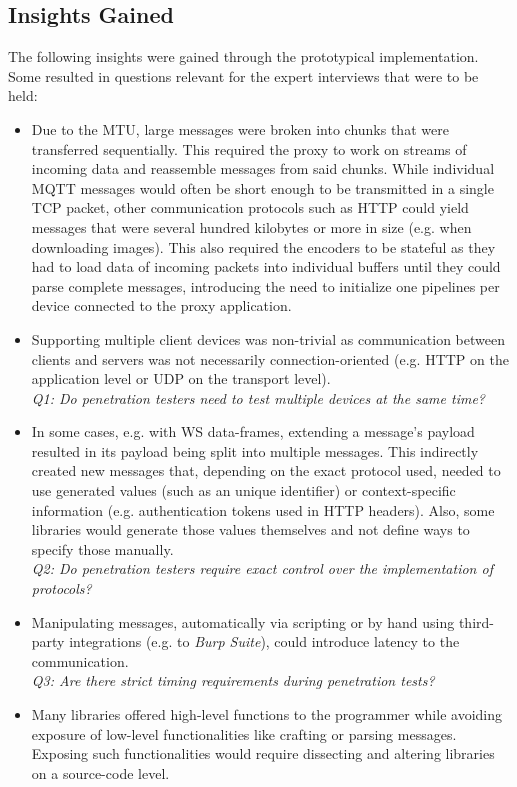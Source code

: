 \subsection{Insights Gained}
\label{sec:prototype-insights}
The following insights were gained through the prototypical implementation. Some resulted in questions relevant for the expert interviews that were to be held:
\begin{itemize}
    \item Due to the \ac{MTU}, large messages were broken into chunks that were transferred sequentially. This required the proxy to work on streams of incoming data and reassemble messages from said chunks. While individual \ac{MQTT} messages would often be short enough to be transmitted in a single \ac{TCP} packet, other communication protocols such as \ac{HTTP} could yield messages that were several hundred kilobytes or more in size (e.g. when downloading images). This also required the encoders to be stateful as they had to load data of incoming packets into individual buffers until they could parse complete messages, introducing the need to initialize one pipelines per device connected to the proxy application.
    \item Supporting multiple client devices was non-trivial as communication between clients and servers was not necessarily connection-oriented (e.g. \ac{HTTP} on the application level or \ac{UDP} on the transport level). \\
          \emph{Q1: Do penetration testers need to test multiple devices at the same time?}
    \item In some cases, e.g. with \ac{WS} data-frames, extending a message's payload resulted in its payload being split into multiple messages. This indirectly created new messages that, depending on the exact protocol used, needed to use generated values (such as an unique identifier) or context-specific information (e.g. authentication tokens used in \ac{HTTP} headers). Also, some libraries would generate those values themselves and not define ways to specify those manually.\\
          \emph{Q2: Do penetration testers require exact control over the implementation of protocols?}
    \item Manipulating messages, automatically via scripting or by hand using third-party integrations (e.g. to \emph{Burp Suite}), could introduce latency to the communication.\\
          \emph{Q3: Are there strict timing requirements during penetration tests?}
    \item Many libraries offered high-level functions to the programmer while avoiding exposure of low-level functionalities like crafting or parsing messages. Exposing such functionalities would require dissecting and altering libraries on a source-code level.
\end{itemize}

